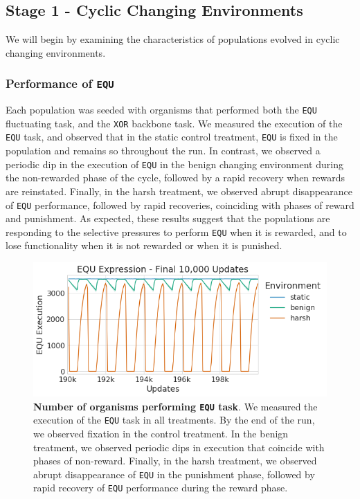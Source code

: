 \documentclass[10pt,letterpaper]{article}
\begin{document}
\subsection*{Stage 1 - Cyclic Changing Environments}
We will begin by examining the characteristics of populations evolved in cyclic changing environments.

\subsubsection*{Performance of \texttt{EQU}}
Each population was seeded with organisms that performed both the \texttt{EQU} fluctuating task, and the \texttt{XOR} backbone task. We measured the execution of the \texttt{EQU} task, and observed that in the static control treatment, \texttt{EQU} is fixed in the population and remains so throughout the run. In contrast, we observed a periodic dip in the execution of \texttt{EQU} in the benign changing environment during the non-rewarded phase of the cycle, followed by a rapid recovery when rewards are reinstated. Finally, in the harsh treatment, we observed abrupt disappearance of \texttt{EQU} performance, followed by rapid recoveries, coinciding with phases of reward and punishment. As expected, these results suggest that the populations are responding to the selective pressures to perform \texttt{EQU} when it is rewarded, and to lose functionality when it is not rewarded or when it is punished.

	\begin{figure}[!h]
	\includegraphics[width=0.75\columnwidth]{figures/CE/CCE_equ_execution.png}
	\caption{\textbf{Number of organisms performing \texttt{EQU} task}. We measured the execution of the \texttt{EQU} task in all treatments. By the end of the run, we observed fixation in the control treatment. In the benign treatment, we observed periodic dips in execution that coincide with phases of non-reward. Finally, in the harsh treatment, we observed abrupt disappearance of \texttt{EQU} in the punishment phase, followed by rapid recovery of \texttt{EQU} performance during the reward phase.
	}
	\label{fig:CCE_equ_execution} %
	\end{figure}
\end{document}
